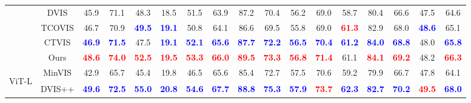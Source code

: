 \begin{table}[t!]
\begin{adjustbox}{max width = \textwidth}
\begin{tabular}{ccccccccccccccccc}
\multicolumn{1}{c|}{} & \multicolumn{1}{c|}{DVIS \citep{DVIS}} & 45.9 & 71.1& 48.3& 18.5  & \multicolumn{1}{c|}{51.5} & 63.9 & 87.2& 70.4& 56.2  & \multicolumn{1}{c|}{69.0}& 58.7 & 80.4& 66.6& 47.5  & 64.6\\
\multicolumn{1}{c|}{} & \multicolumn{1}{c|}{TCOVIS \citep{li2023tcovis}} & 46.7 & 70.9& \textbf{\textcolor{blue}{49.5}}& \textbf{\textcolor{blue}{19.1}}  & \multicolumn{1}{c|}{50.8} & 64.1 & 86.6& 69.5& 55.8  & \multicolumn{1}{c|}{69.0}& \textbf{\textcolor{red}{61.3}} & 82.9& 68.0& \textbf{\textcolor{blue}{48.6}}  & 65.1\\
\multicolumn{1}{c|}{} & \multicolumn{1}{c|}{CTVIS \citep{ying2023ctvis}} & \textbf{\textcolor{blue}{46.9}} & \textbf{\textcolor{blue}{71.5}}& 47.5& \textbf{\textcolor{blue}{19.1}}  & \multicolumn{1}{c|}{\textbf{\textcolor{blue}{52.1}}} & \textbf{\textcolor{blue}{65.6}} & \textbf{\textcolor{blue}{87.7}}& \textbf{\textcolor{blue}{72.2}}& \textbf{\textcolor{blue}{56.5}}  & \multicolumn{1}{c|}{\textbf{\textcolor{blue}{70.4}}}& \textbf{\textcolor{blue}{61.2}} & \textbf{\textcolor{blue}{84.0}}& \textbf{\textcolor{blue}{68.8}}& 48.0  & \textbf{\textcolor{blue}{65.8}}\\
\multicolumn{1}{c|}{} & \multicolumn{1}{c|}{Ours} & \textbf{\textcolor{red}{48.6}} & \textbf{\textcolor{red}{74.0}}& \textbf{\textcolor{red}{52.5}}& \textbf{\textcolor{red}{19.5}}  & \multicolumn{1}{c|}{\textbf{\textcolor{red}{53.3}}} & \textbf{\textcolor{red}{66.0}} & \textbf{\textcolor{red}{89.5}}& \textbf{\textcolor{red}{73.3}}& \textbf{\textcolor{red}{56.8}}  & \multicolumn{1}{c|}{\textbf{\textcolor{red}{71.4}}}& 61.1 & \textbf{\textcolor{red}{84.1}}& \textbf{\textcolor{red}{69.2}}& 48.2  & \textbf{\textcolor{red}{66.3}}\\ \hline

\multicolumn{1}{c|}{\multirow{5}{*}{\begin{turn}{90}{ViT-L }\end{turn}}} & \multicolumn{1}{c|}{MinVIS \citep{huang2022minvis}} & 42.9 & 65.7& 45.4& 19.8  & \multicolumn{1}{c|}{46.5} & 65.6 & 85.4& 72.7& 57.5  & \multicolumn{1}{c|}{70.6}& 59.2 & 79.9& 66.7& 47.8  & 64.1\\

\multicolumn{1}{c|}{} & \multicolumn{1}{c|}{DVIS++ \citep{zhang2023dvis++}} & \textbf{\textcolor{blue}{49.6}} & \textbf{\textcolor{blue}{72.5}} & \textbf{\textcolor{blue}{55.0}} & \textbf{\textcolor{blue}{20.8}} & \multicolumn{1}{c|}{\textbf{\textcolor{blue}{54.6}}} & \textbf{\textcolor{blue}{67.7}} & \textbf{\textcolor{blue}{88.8}} & \textbf{\textcolor{blue}{75.3}} & \textbf{\textcolor{blue}{57.9}}  & \multicolumn{1}{c|}{\textbf{\textcolor{red}{73.7}}}& \textbf{\textcolor{blue}{62.3}} & \textbf{\textcolor{blue}{82.7}} & \textbf{\textcolor{blue}{70.2}} & \textbf{\textcolor{red}{49.5}}  & \textbf{\textcolor{blue}{68.0}}\\


\end{tabular}
\end{adjustbox}
\end{table}
